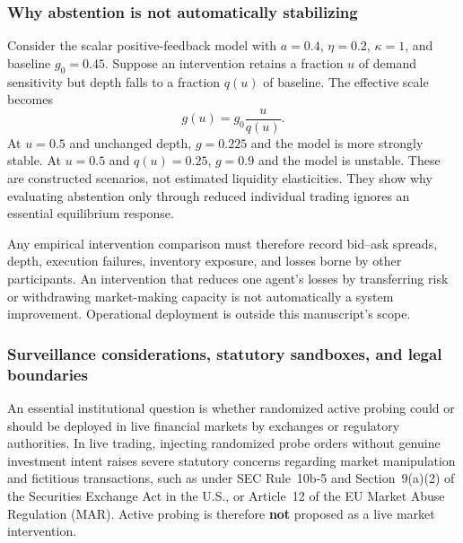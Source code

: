 \documentclass[10pt,twocolumn,letterpaper]{article}
\theoremstyle{definition}
\theoremstyle{remark}
\begin{document}
\subsubsection{Why abstention is not automatically stabilizing}
Consider the scalar positive-feedback model with $a=0.4$, $\eta=0.2$, $\kappa=1$, and baseline $g_0=0.45$. Suppose an intervention retains a fraction $u$ of demand sensitivity but depth falls to a fraction $q(u)$ of baseline. The effective scale becomes
\begin{equation}
 g(u)=g_0\frac{u}{q(u)}.
 \label{eq:gatedepth}
\end{equation}
At $u=0.5$ and unchanged depth, $g=0.225$ and the model is more strongly stable. At $u=0.5$ and $q(u)=0.25$, $g=0.9$ and the model is unstable. These are constructed scenarios, not estimated liquidity elasticities. They show why evaluating abstention only through reduced individual trading ignores an essential equilibrium response.

Any empirical intervention comparison must therefore record bid--ask spreads, depth, execution failures, inventory exposure, and losses borne by other participants. An intervention that reduces one agent's losses by transferring risk or withdrawing market-making capacity is not automatically a system improvement. Operational deployment is outside this manuscript's scope.

\subsubsection{Surveillance considerations, statutory sandboxes, and legal boundaries}
\label{sec:regulatory_feasibility}
An essential institutional question is whether randomized active probing could or should be deployed in live financial markets by exchanges or regulatory authorities. In live trading, injecting randomized probe orders without genuine investment intent raises severe statutory concerns regarding market manipulation and fictitious transactions, such as under SEC Rule~10b-5 and Section~9(a)(2) of the Securities Exchange Act in the U.S., or Article~12 of the EU Market Abuse Regulation (MAR). Active probing is therefore \textbf{not} proposed as a live market intervention.
\end{document}
